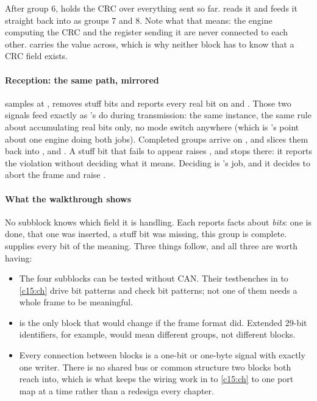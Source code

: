 After group 6,  holds the CRC over everything sent so far.  reads it
and feeds it straight back into  as groups 7 and 8. Note what that means: the
engine computing the CRC and the register sending it are never connected to each other.
 carries the value across, which is why neither block has to know that a CRC
field exists.

\paragraph{Reception: the same path, mirrored}
 samples  at , removes stuff bits and reports
every real bit on  and . Those two signals feed 
exactly as 's do during transmission: the same instance, the same rule about
accumulating real bits only, no mode switch anywhere (which is 's point about one
engine doing both jobs). Completed groups arrive on , and  slices
them back into ,  and . A stuff bit that fails to appear
raises , and  stops there: it reports the violation without
deciding what it means. Deciding is 's job, and it decides to abort the frame
and raise .

\paragraph{What the walkthrough shows}
No subblock knows which field it is handling. Each reports facts about \emph{bits}: one is done, that
one was inserted, a stuff bit was missing, this group is complete.  supplies
every bit of the meaning. Three things follow, and all three are worth having:
\begin{itemize}
  \item The four subblocks can be tested without CAN. Their testbenches in  to
    \ref{c15:ch} drive bit patterns and check bit patterns; not one of them needs a whole frame to be
    meaningful.
  \item {} is the only block that would change if the frame format did. Extended
    29-bit identifiers, for example, would mean different groups, not different blocks.
  \item Every connection between blocks is a one-bit or one-byte signal with exactly one writer.
    There is no shared bus or common structure two blocks both reach into, which is what keeps the
    wiring work in  to \ref{c15:ch} to one port map at a time rather than a redesign
    every chapter.
\end{itemize}

